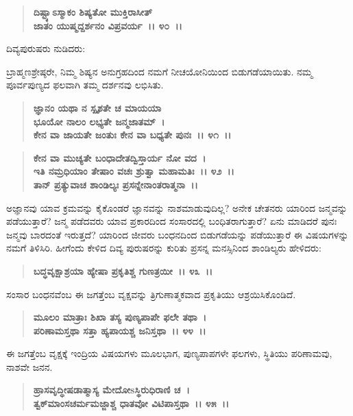 \begin{verse}
\textbf{ದಿಷ್ಟ್ಯಾಽಸ್ಮಾಕಂ ಶಿಷ್ಯತೋ ಮುಕ್ತಿರಾಸೀತ್}\\\textbf{ಜಾತಂ ಯುಷ್ಮದ್ದರ್ಶನಂ ವಿಪ್ರವರ್ಯ~।। ೪೦~।।}
\end{verse}

\begin{flushleft}
ದಿವ್ಯಪುರುಷರು ನುಡಿದರು:
\end{flushleft}

ಬ್ರಾಹ್ಮಣಶ್ರೇಷ್ಠರೇ, ನಿಮ್ಮ ಶಿಷ್ಯನ ಅನುಗ್ರಹದಿಂದ ನಮಗೆ ನೀಚಯೋನಿಯಿಂದ ಬಿಡುಗಡೆಯಾಯಿತು. ನಮ್ಮ ಪೂರ್ವಪುಣ್ಯದ ಫಲವಾಗಿ ತಮ್ಮ ದರ್ಶನವು ಲಭಿಸಿತು.

\begin{verse}
\textbf{ಜ್ಞಾನಂ ಯಥಾ ನ ಸ್ಪೃಶತೇ ಚ ಮಾಯಯಾ}\\\textbf{ಭೂಯೋ ನಾಲಂ ಲಭ್ಯತೇ ಜನ್ಮಜಾತಮ್~। }\\\textbf{ಕೇನ ವಾ ಜಾಯತೇ ಜಂತುಃ ಕೇನ ವಾ ಬಧ್ಯತೇ ಪುನಃ~।। ೪೧~।। }
\end{verse}

\begin{verse}
\textbf{ಕೇನ ವಾ ಮುಚ್ಯತೇ ಬಂಧಾದೇತದ್ವಿಸ್ತಾರ್ಯ ನೋ ವದ~।}\\\textbf{ಇತಿ ನಮ್ರಧಿಯಾಂ ತೇಷಾಂ ವಚಃ ಶ್ರುತ್ವಾ ಮಹಾಮತಿಃ~।। ೪೨~।।}\\\textbf{ತಾನ್ ಪ್ರತ್ಯುವಾಚ ಶಾಂಡಿಲ್ಯಃ ಪ್ರಸನ್ನೇನಾಂತರಾತ್ಮನಾ~।।}
\end{verse}

ಅಜ್ಞಾನವು ಯಾವ ಕ್ರಮವನ್ನು ಕೈಕೊಂಡರೆ ಜ್ಞಾನವನ್ನು ನಾಶಮಾಡುವುದಿಲ್ಲ? ಅನೇಕ ಚೇತನರು ಯಾರಿಂದ ಜನ್ಮವನ್ನು ಪಡೆಯುತ್ತಾರೆ? ಜನ್ಮ ಪಡೆದವರು ಯಾವ ಪ್ರಕಾರದಿಂದ ಸಂಸಾರದಲ್ಲಿ ಬಂಧಿತರಾಗುತ್ತಾರೆ? ಏನು ಮಾಡಿದರೆ ಪುನಃ ಜನ್ಮವು ಬಾರದಂತೆ ಇರುತ್ತದೆ? ಯಾರಿಂದ ಜೀವರು ಬಂಧನದಿಂದ ಬಿಡುಗಡೆಯನ್ನು ಪಡೆಯುತ್ತಾರೆ ಈ ವಿಷಯಗಳನ್ನು ನಮಗೆ ತಿಳಿಸಿರಿ. ಹೀಗೆಂದು ಕೇಳಿದ ದಿವ್ಯ ಪುರುಷರನ್ನು ಕುರಿತು ಪ್ರಸನ್ನ ಮನಸ್ಸಿನಿಂದ ಶಾಂಡಿಲ್ಯರು ಹೇಳಿದರು:

\begin{verse}
\textbf{ಬದ್ಧವೃಕ್ಷಾಶ್ರಯಾ ಹ್ಯೇಷಾ ಪ್ರಕೃತಿಶ್ಚ ಗುಣತ್ರಯೀ~।। ೪೩~।।}
\end{verse}

ಸಂಸಾರ ಬಂಧನವೆಂಬ ಈ ಜಗತ್ತೆಂಬ ವೃಕ್ಷವನ್ನು ತ್ರಿಗುಣಾತ್ಮಕವಾದ ಪ್ರಕೃತಿಯು ಆಶ್ರಯಿಸಿಕೊಂಡಿದೆ.

\begin{verse}
\textbf{ಮೂಲಂ ಮಾತ್ರಾಃ ಶಿಖಾ ತಸ್ಯ ಪುಣ್ಯಪಾಪೇ ಫಲೇ ತಥಾ~।}\\\textbf{ಪರಿಣಾಮಸ್ತಥಾ ಸತ್ತಾ ಹ್ಯಪಾಯಶ್ಚ ಜನಿಸ್ತಥಾ~।। ೪೪~।।}
\end{verse}

ಈ ಜಗತ್ತೆಂಬ ವೃಕ್ಷಕ್ಕೆ ಇಂದ್ರಿಯ ವಿಷಯಗಳು ಮೂಲಭಾಗ, ಪುಣ್ಯಪಾಪಗಳೇ ಫಲಗಳು, ಸ್ಥಿತಿಯು ಪರಿಣಾಮವು, ನಾಶವೇ ಜನನ.

\begin{verse}
\textbf{ಹ್ರಾಸವೃದ್ಧೀಷಡಾತ್ಮಾಸ್ಯ ಮೇದೋsಸ್ಥಿರುಧಿರಾಣಿ ಚ~।}\\\textbf{ತ್ವಕ್‌ಮಾಂಸಚರ್ಮಮಜ್ಜಾಶ್ಚ ಧಾತವೋ ವಿಟಿಪಾಸ್ತಥಾ~।। ೪೫~।।}
\end{verse}

